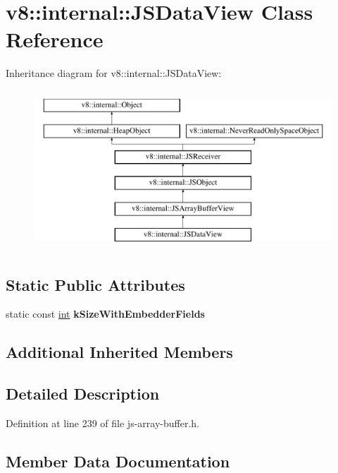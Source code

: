 \hypertarget{classv8_1_1internal_1_1JSDataView}{}\section{v8\+:\+:internal\+:\+:J\+S\+Data\+View Class Reference}
\label{classv8_1_1internal_1_1JSDataView}
Inheritance diagram for v8\+:\+:internal\+:\+:J\+S\+Data\+View\+:\begin{figure}[H]
\begin{center}
\leavevmode
\includegraphics[height=6.000000cm]{classv8_1_1internal_1_1JSDataView}
\end{center}
\end{figure}
\subsection*{Static Public Attributes}
\begin{DoxyCompactItemize}
\item 
static const \mbox{\hyperlink{classint}{int}} {\bfseries k\+Size\+With\+Embedder\+Fields}
\end{DoxyCompactItemize}
\subsection*{Additional Inherited Members}


\subsection{Detailed Description}


Definition at line 239 of file js-\/array-\/buffer.\+h.



\subsection{Member Data Documentation}
\mbox{\label{classv8_1_1internal_1_1JSDataView_ad2995f725b91486f6ddab3ef6fb12d85}} 
